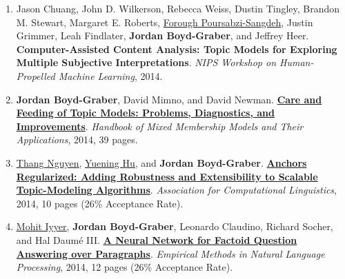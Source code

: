 \documentclass[10pt,a4paper]{article} %
\begin{document}
{\begin{enumerate}
	 \item Jason Chuang, John D. Wilkerson, Rebecca Weiss, Dustin Tingley, Brandon M. Stewart, Margaret E. Roberts, \underline{Forough Poursabzi-Sangdeh}, Justin Grimmer, Leah Findlater, {\bf Jordan Boyd-Graber}, and Jeffrey Heer.  {\bf Computer-Assisted Content Analysis: Topic Models for Exploring Multiple Subjective Interpretations}.  \emph{NIPS Workshop on Human-Propelled Machine Learning}, 2014.

	 \item {\bf Jordan Boyd-Graber}, David Mimno, and David Newman.  {\bf \href{http://cs.colorado.edu/~jbg//docs/2014_book_chapter_care_and_feeding.pdf}{Care and Feeding of Topic Models: Problems, Diagnostics, and Improvements}}.  \emph{Handbook of Mixed Membership Models and Their Applications}, 2014, 39 pages.

	 \item \underline{\href{http://www.umiacs.umd.edu/~daithang/}{Thang Nguyen}}, \underline{\href{http://www.cs.umd.edu/~ynhu/}{Yuening Hu}}, and {\bf Jordan Boyd-Graber}.  {\bf \href{http://cs.colorado.edu/~jbg//docs/2014_acl_anchor_reg.pdf}{Anchors Regularized: Adding Robustness and Extensibility to Scalable Topic-Modeling Algorithms}}.  \emph{Association for Computational Linguistics}, 2014, 10 pages (26\% Acceptance Rate).

	 \item \underline{\href{http://cs.umd.edu/~miyyer/}{Mohit Iyyer}}, {\bf Jordan Boyd-Graber}, Leonardo Claudino, Richard Socher, and Hal {Daum\'{e} III}.  {\bf \href{http://cs.colorado.edu/~jbg//docs/2014_emnlp_qb_rnn.pdf}{A Neural Network for Factoid Question Answering over Paragraphs}}.  \emph{Empirical Methods in Natural Language Processing}, 2014, 12 pages (26\% Acceptance Rate).


\end{enumerate}
}
\end{document}
